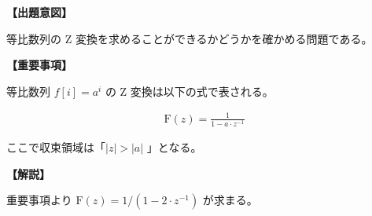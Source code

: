 \noindent \textbf{【出題意図】}

\bigskip
\noindent 等比数列の Z 変換を求めることができるかどうかを確かめる問題である。

\vspace{1em}
\noindent \textbf{【重要事項】}

\medskip
等比数列 $f[i] = a^i$ の Z 変換は以下の式で表される。

\begin{align*}
\textrm{F}(z) = \frac{1}{1-a\cdot z^{-1}}
\end{align*}

\medskip
\noindent ここで収束領域は「$|z| > |a|$ 」となる。

\bigskip

\vspace{1em}
\noindent \textbf{【解説】}

\bigskip
\noindent 重要事項より $\textrm{F}(z) = 1/(1-2\cdot z^{-1}) $ が求まる。
